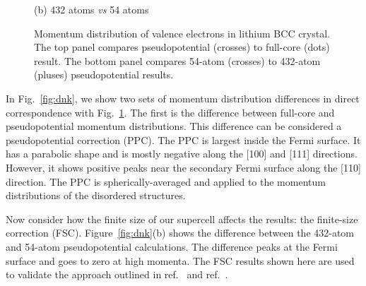 \begin{figure}[h]
\begin{minipage}{0.48\columnwidth}
(b) 432 atoms \textit{vs} 54 atoms
\end{minipage}
\caption{Momentum distribution of valence electrons in lithium BCC crystal. The top panel compares pseudopotential (crosses) to full-core (dots) result.
The bottom panel compares 54-atom (crosses) to 432-atom (pluses) pseudopotential results.\label{fig:nk}}
\end{figure}

In Fig.~\ref{fig:dnk}, we show two sets of momentum distribution differences in direct correspondence with Fig.~\ref{fig:nk}. The first is the difference between full-core and pseudopotential momentum distributions. This difference can be considered a pseudopotential correction (PPC). The PPC is largest inside the Fermi surface. It has a parabolic shape and is mostly negative along the [100] and [111] directions. However, it shows positive peaks near the secondary Fermi surface along the [110] direction.  The PPC is spherically-averaged and applied to the momentum distributions of the disordered structures.

Now consider how the finite size of our supercell affects the results: the finite-size correction (FSC). Figure~\ref{fig:dnk}(b) shows the difference between the 432-atom and 54-atom pseudopotential calculations. The difference peaks at the Fermi surface and goes to zero at high momenta.  The FSC results shown here are used to validate the approach outlined in ref.~\cite{Holzmann2009} and ref.~\cite{Holzmann2011}.

